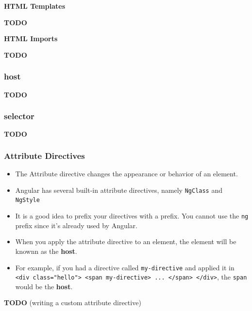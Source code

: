 \documentclass[12pt,]{article}
\providecommand{\tightlist}{%
  \setlength{\itemsep}{0pt}\setlength{\parskip}{0pt}}
\begin{document}
\textbf{HTML Templates}

\textbf{TODO}

\textbf{HTML Imports}

\textbf{TODO}

\subsubsection{host}\label{host}

\textbf{TODO}

\subsubsection{selector}\label{selector}

\textbf{TODO}

\subsubsection{Attribute Directives}\label{attribute-directives}

\begin{itemize}
\tightlist
\item
  The Attribute directive changes the appearance or behavior of an
  element.
\item
  Angular has several built-in attribute directives, namely
  \texttt{NgClass} and \texttt{NgStyle}
\item
  It is a good idea to prefix your directives with a prefix. You cannot
  use the \texttt{ng} prefix since it's already used by Angular.
\item
  When you apply the attribute directive to an element, the element will
  be knownn as the \textbf{host}.
\item
  For example, if you had a directive called \texttt{my-directive} and
  applied it in
  \texttt{\textless{}div\ class="hello"\textgreater{}\ \textless{}span\ my-directive\textgreater{}\ ...\ \textless{}/span\textgreater{}\ \textless{}/div\textgreater{}},
  the \texttt{span} would be the \textbf{host}.
\end{itemize}

\textbf{TODO} (writing a custom attribute directive)
\end{document}
